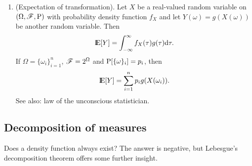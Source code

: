 \documentclass[a4paper,10pt]{article}
\begin{document}
\begin{enumerate}
  \item (Expectation of transformation). Let $X$ be a real-valued random variable on \((\Omega,\mathscr{F},\mathrm{P})\) with 
  probability density function \(f_X\) and let $Y(\omega) = g(X(\omega))$  
  be another random variable. Then
  \[
   \E[Y] = \int_{-\infty}^{\infty} f_X(\tau) g(\tau) \d \tau.
  \]
  If $\Omega=\{\omega_i\}_{i=1}^{n}$, $\mathscr{F}=2^\Omega$ and $\mathrm{P}[\{\omega\}_i] = p_i$, then
  \[
   \E[Y] = \sum_{i=1}^{n}p_i g(X(\omega_i)).
  \]
  See also: law of the unconscious statistician.


\end{enumerate}

\subsection{Decomposition of measures}
Does a density function always exist? The answer is negative, but Lebesgue's decomposition 
theorem offers some further insight. 
\end{document}
